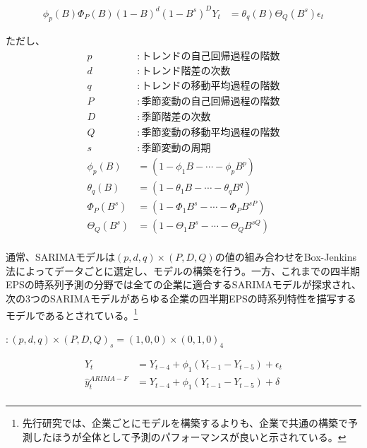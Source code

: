 \documentclass[a4paper, 12pt]{jsarticle}
\begin{document}
\begin{equation}
  \begin{split}
    \phi_p(B)\Phi_{P}(B)(1-B)^d(1-B^s)^DY_t &= \theta_q(B)\Theta_Q(B^s)\epsilon_t
  \end{split}
\end{equation}

ただし、
\begin{equation}
  \begin{split}
    p &: トレンドの自己回帰過程の階数 \\
    d &: トレンド階差の次数 \\
    q &: トレンドの移動平均過程の階数 \\
    P &: 季節変動の自己回帰過程の階数 \\
    D &: 季節階差の次数 \\
    Q &: 季節変動の移動平均過程の階数 \\
    s &: 季節変動の周期 \\
    \phi_p(B) &= (1 - \phi_1B - \cdots - \phi_pB^p) \\
    \theta_q(B) &= (1 - \theta_1B - \cdots - \theta_qB^q) \\
    \Phi_P(B^s) &= (1 - \Phi_1B^s - \cdots - \Phi_PB^{sP}) \\
    \Theta_Q(B^s) &= (1 - \Theta_1B^s - \cdots - \Theta_QB^{sQ}) \\
  \end{split}
\end{equation}

通常、SARIMAモデルは$(p, d, q) \times (P, D, Q)$の値の組み合わせをBox-Jenkins法によってデータごとに選定し、モデルの構築を行う。一方、これまでの四半期EPSの時系列予測の分野では全ての企業に適合するSARIMAモデルが探求され、次の3つのSARIMAモデル\citep*{foster1977quarterly, griffin1977time, brown1979univariate}があらゆる企業の四半期EPSの時系列特性を描写するモデルであるとされている。\footnote{先行研究では、企業ごとにモデルを構築するよりも、企業で共通の構築で予測したほうが全体として予測のパフォーマンスが良いと示されている。}

\cite{foster1977quarterly} $: (p, d, q) \times (P, D, Q)_s = (1, 0, 0) \times (0, 1, 0)_4$

\begin{equation}
  \begin{split}
    Y_t &= Y_{t-4} + \phi_1(Y_{t-1} - Y_{t-5}) + \epsilon_t \\
    \hat{y}_t^{ARIMA-F} &= Y_{t-4} + \phi_1(Y_{t-1} - Y_{t-5}) + \delta \\
  \end{split}
\end{equation}
\end{document}
